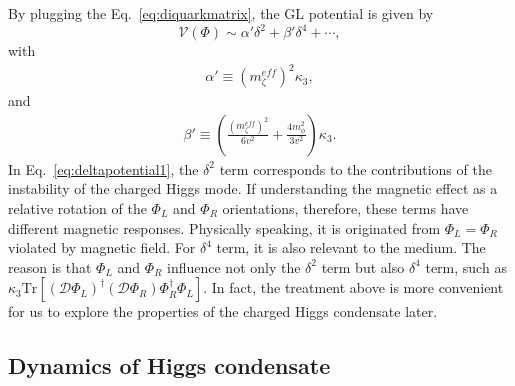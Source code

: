 \documentclass[prd, showpacs,nofootinbib,amsmath,amssymb]{revtex4}
\begin{document}
By plugging the Eq.~\eqref{eq:diquarkmatrix},
the GL potential  is given by
\begin{equation}
\label{eq:deltapotential1}
\mathcal{V}(\Phi) \sim  \alpha' \delta^2 + \beta'\delta^4 + \cdots,
\end{equation}
with
\begin{eqnarray}
  \label{eq:coefficients}
\alpha' \equiv (m_\zeta^{eff})^2\kappa_3,
\end{eqnarray}
and
\begin{eqnarray}
  \label{eq:coefficients2}\beta' \equiv (\frac{(m_\zeta^{eff})^2}{6v^2} + \frac{4 m_\phi^2}{3v^2})\kappa_3.
\end{eqnarray}
In Eq.~\eqref{eq:deltapotential1}, the $\delta^2$ term corresponds to the contributions of the instability of the charged Higgs mode.
If understanding the magnetic
effect as a relative rotation of the $\Phi_L$ and  $\Phi_R$ orientations, therefore, these terms have different
magnetic responses.
Physically speaking, it is originated from $\Phi_L = \Phi_R$ violated by magnetic field.
For $\delta^4$ term, it is also relevant to the medium. The reason is that $\Phi_L$ and $\Phi_R$ influence not only the $\delta^2$ term
but also $\delta^4$ term, such as  $\kappa_3\text{Tr}[(\mathcal{D}\Phi_L)^\dagger(\mathcal{D}\Phi_R) \Phi_R^\dagger\Phi_L]$.
In fact, the treatment above is more convenient for us to explore the properties of the charged Higgs condensate later.
\subsection{Dynamics of Higgs condensate}

% 
\end{document}
